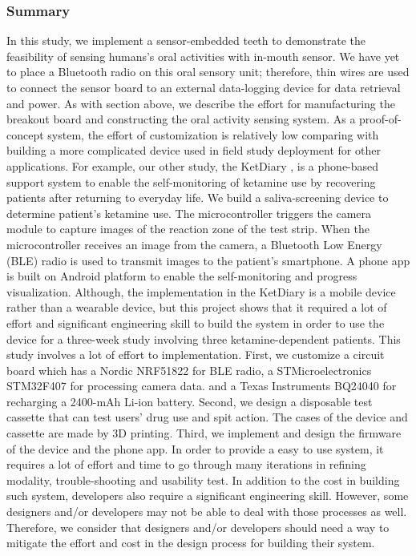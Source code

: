 \subsubsection{Summary}
In this study, we implement a sensor-embedded teeth \cite{Li2013teeth} to demonstrate the feasibility of sensing humans's oral activities with in-mouth sensor. We have yet to place a Bluetooth radio on this oral sensory unit; therefore, thin wires are used to connect the sensor board to an external data-logging device for data retrieval and power.
As with section above, we describe the effort for manufacturing the breakout board and constructing the oral activity sensing system.
As a proof-of-concept system, the effort of customization is relatively low comparing with building a more complicated device used in field study deployment for other applications.
For example, our other study, the KetDiary \cite{You2016Ket}, is a phone-based support system to enable the self-monitoring of ketamine use by recovering patients after returning to everyday life. 
We build a saliva-screening device to determine patient's ketamine use.
The microcontroller triggers the camera module to capture images of the reaction zone of the test strip. When the microcontroller receives an image from the camera, a Bluetooth Low Energy (BLE) radio is used to transmit images to the patient's smartphone. 
A phone app is built on Android platform to enable the self-monitoring and progress visualization. 
Although, the implementation in the KetDiary is a mobile device rather than a wearable device, but this project shows that it required a lot of effort and significant engineering skill to build the system in order to use the device for a three-week study involving three ketamine-dependent patients.
This study involves a lot of effort to implementation. First, we customize a circuit board which has a Nordic NRF51822 for BLE radio, a STMicroelectronics STM32F407 for processing camera data. and a Texas Instruments BQ24040 for recharging a 2400-mAh Li-ion battery. Second, we design a disposable test cassette that can test users' drug use and spit action. The cases of the device and cassette are made by 3D printing. Third, we implement and design the firmware of the device and the phone app. In order to provide a easy to use system, it requires a lot of effort and time to go through many iterations in refining modality, trouble-shooting and usability test. In addition to the cost in building such system, developers also require a significant engineering skill. However, some designers and/or developers may not be able to deal with those processes as well. Therefore, we consider that designers and/or developers should need a way to mitigate the effort and cost in the design process for building their system.


